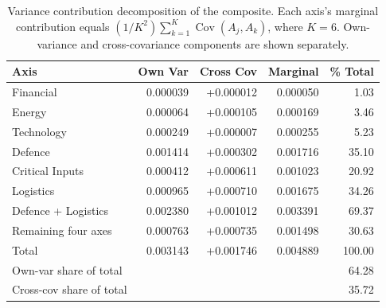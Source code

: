 \begin{table}[htbp]
\centering
\caption{Variance contribution decomposition of the \ISI composite.  Each axis's marginal contribution equals $(1/K^2)\sum_{k=1}^{K}\operatorname{Cov}(A_j, A_k)$, where $K=6$.  Own-variance and cross-covariance components are shown separately.}
\label{tab:variance-decomp}
\small
\begin{tabular}{@{}l rrrr@{}}
\toprule
\textbf{Axis} & \textbf{Own Var} & \textbf{Cross Cov} & \textbf{Marginal} & \textbf{\% Total} \\
\midrule
  Financial & 0.000039 & +0.000012 & 0.000050 & 1.03 \\
  Energy & 0.000064 & +0.000105 & 0.000169 & 3.46 \\
  Technology & 0.000249 & +0.000007 & 0.000255 & 5.23 \\
  Defence & 0.001414 & +0.000302 & 0.001716 & 35.10 \\
  Critical Inputs & 0.000412 & +0.000611 & 0.001023 & 20.92 \\
  Logistics & 0.000965 & +0.000710 & 0.001675 & 34.26 \\
\midrule
  Defence + Logistics & 0.002380 & +0.001012 & 0.003391 & 69.37 \\
  Remaining four axes & 0.000763 & +0.000735 & 0.001498 & 30.63 \\
\addlinespace
  Total & 0.003143 & +0.001746 & 0.004889 & 100.00 \\
\addlinespace
  Own-var share of total & \multicolumn{3}{r}{} & 64.28 \\
  Cross-cov share of total & \multicolumn{3}{r}{} & 35.72 \\
\bottomrule
\end{tabular}
\end{table}